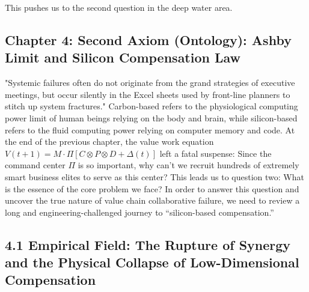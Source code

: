 \documentclass[11pt,a4paper]{article}
\begin{document}
This pushes us to the second question in the deep water area.

\subsection*{Chapter 4: Second Axiom (Ontology): Ashby Limit and Silicon Compensation Law}
"Systemic failures often do not originate from the grand strategies of executive meetings, but occur silently in the Excel sheets used by front-line planners to stitch up system fractures." Carbon-based refers to the physiological computing power limit of human beings relying on the body and brain, while silicon-based refers to the fluid computing power relying on computer memory and code. At the end of the previous chapter, the value work equation $V(t+1) = M \cdot \Pi [ C \otimes P \otimes D + \Delta(t) ]$ left a fatal suspense: Since the command center $\Pi$ is so important, why can’t we recruit hundreds of extremely smart business elites to serve as this center? This leads us to question two: What is the essence of the core problem we face? In order to answer this question and uncover the true nature of value chain collaborative failure, we need to review a long and engineering-challenged journey to “silicon-based compensation.”


\subsection*{4.1 Empirical Field: The Rupture of Synergy and the Physical Collapse of Low-Dimensional Compensation}
\end{document}

